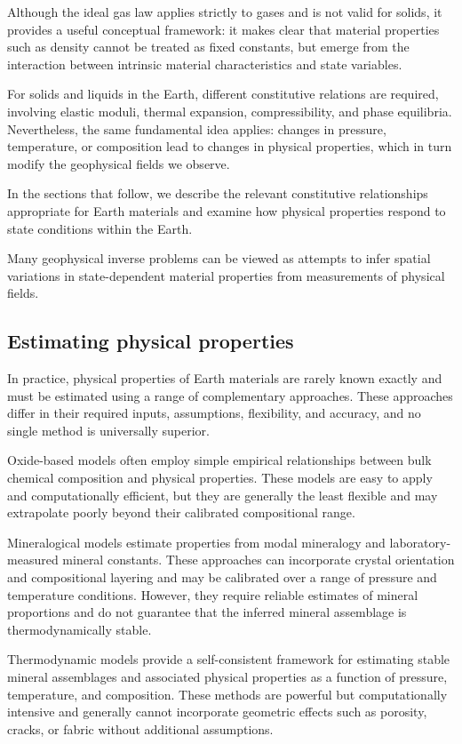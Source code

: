 Although the ideal gas law applies strictly to gases and is not valid for solids, it provides a useful conceptual framework: it makes clear that material properties such as density cannot be treated as fixed constants, but emerge from the interaction between intrinsic material characteristics and state variables.

For solids and liquids in the Earth, different constitutive relations are required, involving elastic moduli, thermal expansion, compressibility, and phase equilibria. Nevertheless, the same fundamental idea applies: changes in pressure, temperature, or composition lead to changes in physical properties, which in turn modify the geophysical fields we observe.

In the sections that follow, we describe the relevant constitutive relationships appropriate for Earth materials and examine how physical properties respond to state conditions within the Earth.

Many geophysical inverse problems can be viewed as attempts to infer spatial variations in state-dependent material properties from measurements of physical fields.


\subsection{Estimating physical properties}
In practice, physical properties of Earth materials are rarely known exactly and must be estimated using a range of complementary approaches. These approaches differ in their required inputs, assumptions, flexibility, and accuracy, and no single method is universally superior.

Oxide-based models often employ simple empirical relationships between bulk chemical composition and physical properties. These models are easy to apply and computationally efficient, but they are generally the least flexible and may extrapolate poorly beyond their calibrated compositional range.

Mineralogical models estimate properties from modal mineralogy and laboratory-measured mineral constants. These approaches can incorporate crystal orientation and compositional layering and may be calibrated over a range of pressure and temperature conditions. However, they require reliable estimates of mineral proportions and do not guarantee that the inferred mineral assemblage is thermodynamically stable.

Thermodynamic models provide a self-consistent framework for estimating stable mineral assemblages and associated physical properties as a function of pressure, temperature, and composition. These methods are powerful but computationally intensive and generally cannot incorporate geometric effects such as porosity, cracks, or fabric without additional assumptions.

